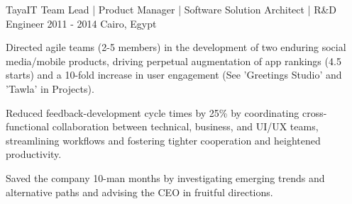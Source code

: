 \begin{cventries}





  \cventry
    {TayaIT} %
    {Team Lead | Product Manager | Software Solution Architect | R\&D Engineer}
    {2011 - 2014} %
    {Cairo, Egypt} %
    {
      \begin{cvitems} %
		\item {Directed agile teams (2-5 members) in the development of two enduring social media/mobile products, driving perpetual augmentation of app rankings (4.5 starts) and a 10-fold increase in user engagement (See 'Greetings Studio' and 'Tawla' in Projects).}
		\item {Reduced feedback-development cycle times by 25\% by coordinating cross-functional collaboration between technical, business, and UI/UX teams, streamlining workflows and fostering tighter cooperation and heightened productivity.}
		\item {Saved the company 10-man months by investigating emerging trends and alternative paths and advising the CEO in fruitful directions.}
      \end{cvitems}
    }





\end{cventries}

\vspace{-0.5ex}

